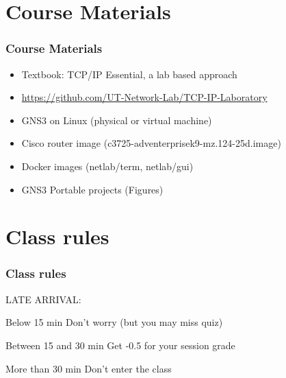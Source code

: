 \documentclass[aspectratio=169,15pt]{beamer}
\begin{document}
\section{Course Materials}
\begin{frame}
    \frametitle{Course Materials}

    \begin{itemize}
        \item Textbook: TCP/IP Essential, a lab based approach
        \item \url{https://github.com/UT-Network-Lab/TCP-IP-Laboratory}
        \item GNS3 on Linux (physical or virtual machine)
        \item Cisco router image (c3725-adventerprisek9-mz.124-25d.image)
        \item Docker images (netlab/term, netlab/gui)
        \item GNS3 Portable projects (Figures)
    \end{itemize}

\end{frame}

\section{Class rules}
\begin{frame}
    \frametitle{Class rules}

    LATE ARRIVAL:

    {
        \begin{block}{Below 15 min} Don’t worry (but you may miss quiz) \end{block}
    }
    {
        \begin{block}{Between 15 and 30 min} Get -0.5 for your session grade \end{block}
    }
    \begin{alertblock}{More than 30 min} Don’t enter the class \end{alertblock}

\end{frame}
\end{document}
